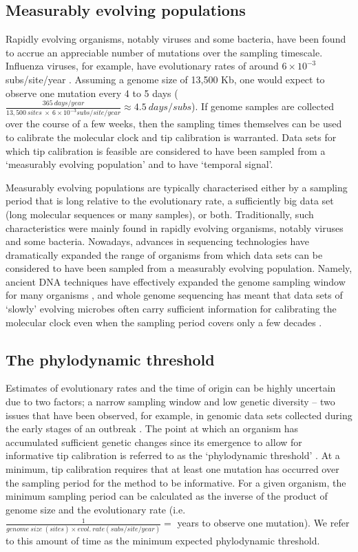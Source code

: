 \documentclass[11pt]{article}
\begin{document}
\subsection{Measurably evolving populations}
Rapidly evolving organisms, notably viruses and some bacteria, have been found to accrue an appreciable number of mutations over the sampling timescale. Influenza viruses, for example, have evolutionary rates of around $6\times10^{-3}$ subs/site/year \citep{ghafari2021purifying, sanjuan2012molecular}. Assuming a genome size of 13,500 Kb, one would expect to observe one mutation every 4 to 5 days ($\frac{365\ days/year}{13,500\ sites\ \times\ 6\times10^{-3}subs/site/year}\approx4.5\ days/subs$). If genome samples are collected over the course of a few weeks, then the sampling times themselves can be used to calibrate the molecular clock and tip calibration is warranted. Data sets for which tip calibration is feasible are considered to have been sampled from a `measurably evolving population' \citep{drummond2003measurably} and to have `temporal signal'. 

Measurably evolving populations are typically characterised either by a sampling period that is long relative to the evolutionary rate, a sufficiently big data set (long molecular sequences or many samples), or both. Traditionally, such characteristics were mainly found in rapidly evolving organisms, notably viruses and some bacteria. Nowadays, advances in sequencing technologies have dramatically expanded the range of organisms from which data sets can be considered to have been sampled from a measurably evolving population. Namely, ancient DNA techniques have effectively expanded the genome sampling window for many organisms \citep{spyrou2019ancient, duchene2020recovery}, and whole genome sequencing has meant that data sets of `slowly' evolving microbes often carry sufficient information for calibrating the molecular clock  \citep{biek2015measurably} even when the sampling period covers only a few decades \citep{menardo2019molecular}.

\subsection{The phylodynamic threshold}
Estimates of evolutionary rates and the time of origin can be highly uncertain due to two factors; a narrow sampling window and low genetic diversity – two issues that have been observed, for example, in genomic data sets collected during the early stages of an outbreak \citep{duchene2020temporal}. The point at which an organism has accumulated sufficient genetic changes since its emergence to allow for informative tip calibration is referred to as the ‘phylodynamic threshold’ \citep{duchene2020temporal}. At a minimum, tip calibration requires that at least one mutation has occurred over the sampling period for the method to be informative. For a given organism, the minimum sampling period can be calculated as the inverse of the product of genome size and the evolutionary rate (i.e. $\frac{1}{genome\ size\ (sites) \times evol.\ rate (subs/site/year)}=$ years to observe one mutation). We refer to this amount of time as the minimum expected phylodynamic threshold. 
\end{document}
